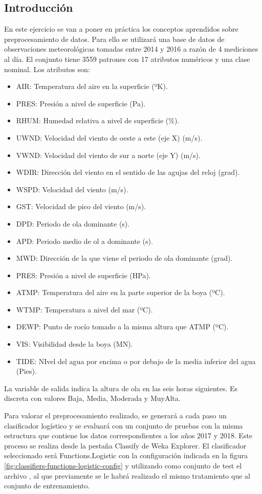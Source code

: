 \subsection{Introducción}
En este ejercicio se van a poner en práctica los conceptos aprendidos sobre preprocesamiento de datos. Para ello se utilizará una base de datos de observaciones meteorológicas tomadas entre 2014 y 2016 a razón de 4 mediciones al día. El conjunto tiene 3559 patrones con 17 atributos numéricos y una clase nominal. Los atributos son:
\begin{itemize}
    \item AIR: Temperatura del aire en la superficie (ºK).
    \item PRES: Presión a nivel de superficie (Pa).
    \item RHUM: Humedad relativa a nivel de superficie (\%).
    \item UWND: Velocidad del viento de oeste a este (eje X) (m/s).
    \item VWND: Velocidad del viento de sur a norte (eje Y) (m/s).
    \item WDIR: Dirección del viento en el sentido de las agujas del reloj (grad).
    \item WSPD: Velocidad del viento (m/s).
    \item GST: Velocidad de pico del viento (m/s).
    \item DPD: Periodo de ola dominante (s).
    \item APD: Periodo medio de ol a dominante (s).
    \item MWD: Dirección de la que viene el periodo de ola dominante (grad).
    \item PRES: Presión a nivel de superficie (HPa).
    \item ATMP: Temperatura del aire en la parte superior de la boya (ºC).
    \item WTMP: Temperatura a nivel del mar (ºC).
    \item DEWP: Punto de rocío tomado a la misma altura que ATMP (ºC).
    \item VIS: Visibilidad desde la boya (MN).
    \item TIDE: NIvel del agua por encima o por debajo de la media inferior del agua (Pies).
\end{itemize}
La variable de salida indica la altura de ola en las seis horas siguientes. Es discreta con valores Baja, Media, Moderada y MuyAlta.

Para valorar el preprocesamiento realizado, se generará a cada paso un clasificador logístico y se evaluará con un conjunto de pruebas con la misma estructura que contiene los datos correspondientes a los años 2017 y 2018. Este proceso se realiza desde la pestaña Classify de Weka Explorer. El clasificador seleccionado será Functions.Logistic con la configuración indicada en la figura \ref{fig:classifiers-functions-logistic-config} y utilizando como conjunto de test el archivo , al que previamente se le habrá realizado el mismo tratamiento que al conjunto de entrenamiento.

